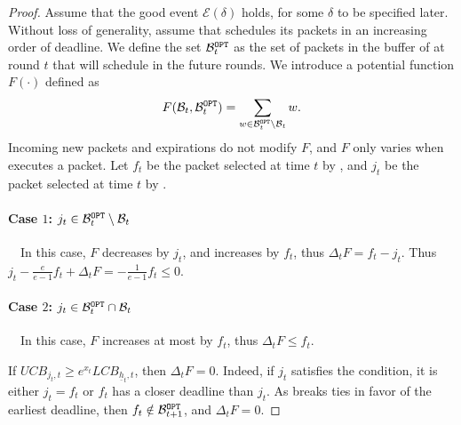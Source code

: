 \begin{proof}
    Assume that the good event $\mathcal{E}(\delta)$ holds, for some $\delta$ to be specified later. Without loss of generality, assume that \opt schedules its packets in an increasing order of deadline. We define the set $\mathcal{B}_{t}^{\text{\opt}}$ as the set of packets in the buffer of \opt at round $t$ that \opt will schedule in the future rounds. We introduce a potential function $F(\cdot)$ defined as $$F(\mathcal{B}_t, \mathcal{B}_t^{\text{\opt}})=\sum_{w \in \mathcal{B}_t^{\text{\opt}} \setminus \mathcal{B}_t} w.$$
    Incoming new packets and expirations do not modify $F$, and $F$ only varies when \algrs executes a packet. Let $f_t$ be the packet selected at time $t$ by \algrs, and $j_t$ be the packet selected at time $t$ by \opt.
    
    \paragraph{Case $1$: $j_t \in \mathcal{B}_t^{\text{\opt}} \setminus \mathcal{B}_t$}~~In this case, $F$ decreases by $j_t$, and increases by $f_t$, thus $\Delta_t F = f_t-j_t$. Thus $j_t-\frac{e}{e-1}f_t + \Delta_t F = -\frac{1}{e-1}f_t \le 0$. 
    
    \paragraph{Case $2$: $j_t \in \mathcal{B}_t^{\text{\opt}} \cap \mathcal{B}_t$}~~In this case, $F$ increases at most by $f_t$, thus $\Delta_t F \le f_t$.
    
    If $UCB_{j_t,t}\ge e^{x_t} LCB_{\underline{h}_t,t}$, then $\Delta_t F = 0$. Indeed, if $j_t$ satisfies the \algrs condition, it is either $j_t=f_t$ or $f_t$ has a closer deadline than $j_t$. As \opt breaks ties in favor of the earliest deadline, then $f_t \notin \mathcal{B}_{t+1}^{\text{\opt}}$, and $\Delta_t F = 0$.


\end{proof}

